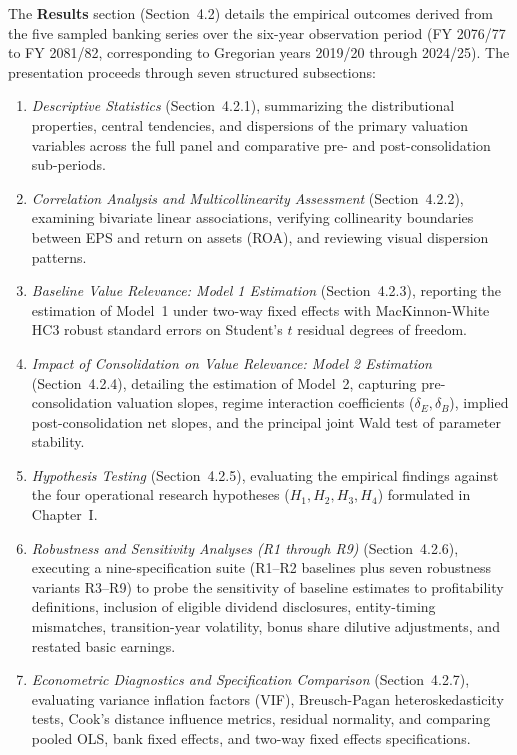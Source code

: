 The \textbf{Results} section (Section~4.2) details the empirical outcomes derived from the five sampled banking series over the six-year observation period (FY 2076/77 to FY 2081/82, corresponding to Gregorian years 2019/20 through 2024/25). The presentation proceeds through seven structured subsections:
\begin{enumerate}
    \item \textit{Descriptive Statistics} (Section~4.2.1), summarizing the distributional properties, central tendencies, and dispersions of the primary valuation variables across the full panel and comparative pre- and post-consolidation sub-periods.
    \item \textit{Correlation Analysis and Multicollinearity Assessment} (Section~4.2.2), examining bivariate linear associations, verifying collinearity boundaries between EPS and return on assets (ROA), and reviewing visual dispersion patterns.
    \item \textit{Baseline Value Relevance: Model 1 Estimation} (Section~4.2.3), reporting the estimation of Model~1 under two-way fixed effects with MacKinnon-White HC3 robust standard errors on Student's $t$ residual degrees of freedom.
    \item \textit{Impact of Consolidation on Value Relevance: Model 2 Estimation} (Section~4.2.4), detailing the estimation of Model~2, capturing pre-consolidation valuation slopes, regime interaction coefficients ($\delta_E, \delta_B$), implied post-consolidation net slopes, and the principal joint Wald test of parameter stability.
    \item \textit{Hypothesis Testing} (Section~4.2.5), evaluating the empirical findings against the four operational research hypotheses ($H_1, H_2, H_3, H_4$) formulated in Chapter~I.
    \item \textit{Robustness and Sensitivity Analyses (R1 through R9)} (Section~4.2.6), executing a nine-specification suite (R1--R2 baselines plus seven robustness variants R3--R9) to probe the sensitivity of baseline estimates to profitability definitions, inclusion of eligible dividend disclosures, entity-timing mismatches, transition-year volatility, bonus share dilutive adjustments, and restated basic earnings.
    \item \textit{Econometric Diagnostics and Specification Comparison} (Section~4.2.7), evaluating variance inflation factors (VIF), Breusch-Pagan heteroskedasticity tests, Cook's distance influence metrics, residual normality, and comparing pooled OLS, bank fixed effects, and two-way fixed effects specifications.
\end{enumerate}

